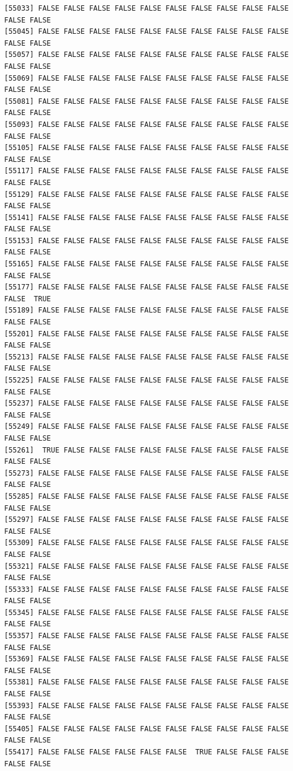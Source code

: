 \documentclass[
  a4paper,
  DIV=11,
  numbers=noendperiod]{scrartcl}
\begin{document}
\begin{verbatim}
[55033] FALSE FALSE FALSE FALSE FALSE FALSE FALSE FALSE FALSE FALSE FALSE FALSE
[55045] FALSE FALSE FALSE FALSE FALSE FALSE FALSE FALSE FALSE FALSE FALSE FALSE
[55057] FALSE FALSE FALSE FALSE FALSE FALSE FALSE FALSE FALSE FALSE FALSE FALSE
[55069] FALSE FALSE FALSE FALSE FALSE FALSE FALSE FALSE FALSE FALSE FALSE FALSE
[55081] FALSE FALSE FALSE FALSE FALSE FALSE FALSE FALSE FALSE FALSE FALSE FALSE
[55093] FALSE FALSE FALSE FALSE FALSE FALSE FALSE FALSE FALSE FALSE FALSE FALSE
[55105] FALSE FALSE FALSE FALSE FALSE FALSE FALSE FALSE FALSE FALSE FALSE FALSE
[55117] FALSE FALSE FALSE FALSE FALSE FALSE FALSE FALSE FALSE FALSE FALSE FALSE
[55129] FALSE FALSE FALSE FALSE FALSE FALSE FALSE FALSE FALSE FALSE FALSE FALSE
[55141] FALSE FALSE FALSE FALSE FALSE FALSE FALSE FALSE FALSE FALSE FALSE FALSE
[55153] FALSE FALSE FALSE FALSE FALSE FALSE FALSE FALSE FALSE FALSE FALSE FALSE
[55165] FALSE FALSE FALSE FALSE FALSE FALSE FALSE FALSE FALSE FALSE FALSE FALSE
[55177] FALSE FALSE FALSE FALSE FALSE FALSE FALSE FALSE FALSE FALSE FALSE  TRUE
[55189] FALSE FALSE FALSE FALSE FALSE FALSE FALSE FALSE FALSE FALSE FALSE FALSE
[55201] FALSE FALSE FALSE FALSE FALSE FALSE FALSE FALSE FALSE FALSE FALSE FALSE
[55213] FALSE FALSE FALSE FALSE FALSE FALSE FALSE FALSE FALSE FALSE FALSE FALSE
[55225] FALSE FALSE FALSE FALSE FALSE FALSE FALSE FALSE FALSE FALSE FALSE FALSE
[55237] FALSE FALSE FALSE FALSE FALSE FALSE FALSE FALSE FALSE FALSE FALSE FALSE
[55249] FALSE FALSE FALSE FALSE FALSE FALSE FALSE FALSE FALSE FALSE FALSE FALSE
[55261]  TRUE FALSE FALSE FALSE FALSE FALSE FALSE FALSE FALSE FALSE FALSE FALSE
[55273] FALSE FALSE FALSE FALSE FALSE FALSE FALSE FALSE FALSE FALSE FALSE FALSE
[55285] FALSE FALSE FALSE FALSE FALSE FALSE FALSE FALSE FALSE FALSE FALSE FALSE
[55297] FALSE FALSE FALSE FALSE FALSE FALSE FALSE FALSE FALSE FALSE FALSE FALSE
[55309] FALSE FALSE FALSE FALSE FALSE FALSE FALSE FALSE FALSE FALSE FALSE FALSE
[55321] FALSE FALSE FALSE FALSE FALSE FALSE FALSE FALSE FALSE FALSE FALSE FALSE
[55333] FALSE FALSE FALSE FALSE FALSE FALSE FALSE FALSE FALSE FALSE FALSE FALSE
[55345] FALSE FALSE FALSE FALSE FALSE FALSE FALSE FALSE FALSE FALSE FALSE FALSE
[55357] FALSE FALSE FALSE FALSE FALSE FALSE FALSE FALSE FALSE FALSE FALSE FALSE
[55369] FALSE FALSE FALSE FALSE FALSE FALSE FALSE FALSE FALSE FALSE FALSE FALSE
[55381] FALSE FALSE FALSE FALSE FALSE FALSE FALSE FALSE FALSE FALSE FALSE FALSE
[55393] FALSE FALSE FALSE FALSE FALSE FALSE FALSE FALSE FALSE FALSE FALSE FALSE
[55405] FALSE FALSE FALSE FALSE FALSE FALSE FALSE FALSE FALSE FALSE FALSE FALSE
[55417] FALSE FALSE FALSE FALSE FALSE FALSE  TRUE FALSE FALSE FALSE FALSE FALSE

\end{verbatim}
\end{document}
